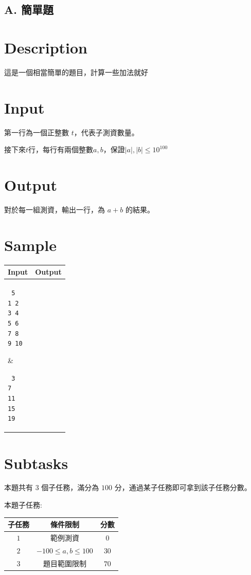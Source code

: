 \documentclass[11pt,a4paper]{article}
\begin{document}
\begin{center}
\section*{A. 簡單題}
\end{center}

\section*{Description}

這是一個相當簡單的題目，計算一些加法就好

\section*{Input}
第一行為一個正整數 $t$，代表子測資數量。

接下來$t$行，每行有兩個整數$a, b$，保證$|a|, |b| \leq 10^{100}$


\section*{Output}

對於每一組測資，輸出一行，為 $a+b$ 的結果。

\section*{Sample}
\begin{longtable}[!h]{|p{}|p{}|}
\hline
\textbf {Input}	& \textbf {Output} \\
\hline
\parbox[t]{0.5\textwidth} %
{ \tt
5\\
1 2\\
3 4\\
5 6\\
7 8\\
9 10\\
} &
\parbox[t]{0.5\textwidth}
{ \tt
3\\
7\\
11\\
15\\
19\\
} \\
\hline
\end{longtable}


\section*{Subtasks}

本題共有 $3$ 個子任務，滿分為 $100$ 分，通過某子任務即可拿到該子任務分數。

本題子任務:

\begin{center}
    \begin{tabular}{||c c c||}
    \hline
    子任務 & 條件限制 & 分數 \\
    \hline
    $1$ & 範例測資 & $0$ \\
    \hline
    $2$ & $-100 \leq a, b \leq 100$ & $30$  \\
    \hline
    $3$ & 題目範圍限制 & $70$ \\
    \hline
    \end{tabular}
\end{center}
\end{document}
